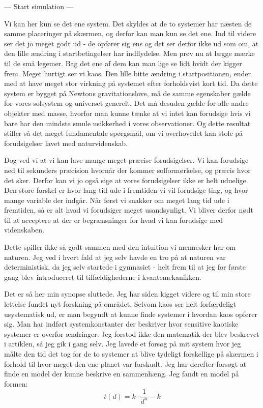 \documentclass[12pt,a4paper]{article}
\theoremstyle{break}
\theoremstyle{nonumberplain}
\begin{document}
\begin{center}
    --- Start simulation ---
\end{center}

Vi kan her kun se det ene system. 
Det skyldes at de to systemer har næsten de samme placeringer på skærmen, og derfor kan man kun se det ene.
Ind til videre ser det jo meget godt ud - de opfører sig ens og det ser derfor ikke ud som om, at den lille ændring i startbetingelser har indflydelse. 
Men prøv nu at lægge mærke til de små legemer.
Bag det ene af dem kan man lige se lidt hvidt der kigger frem. 
Meget hurtigt ser vi kaos. 
Den lille bitte ændring i startpositionen, ender med at have meget stor virkning på systemet efter forholdsvist kort tid. 
Da dette system er bygget på Newtons gravitationslove, må de samme egenskaber gælde for vores solsystem og universet generelt. 
Det må desuden gælde for alle andre objekter med masse, hvorfor man kunne tænke at vi intet kan forudsige hvis vi bare har den mindste smule usikkerhed i vores observationer. 
Og dette resultat stiller så det meget fundamentale spørgsmål, om vi overhovedet kan stole på forudsigelser lavet med naturvidenskab.

Dog ved vi at vi kan lave mange meget præcise forudsigelser. 
Vi kan forudsige ned til sekunders præcision hvornår der kommer solformørkelse, og præcis hvor det sker.
Derfor kan vi jo også sige at vores forudsigelser ikke er helt uduelige. 
Den store forskel er hvor lang tid ude i fremtiden vi vil forudsige ting, og hvor mange variable der indgår.
Når først vi snakker om meget lang tid ude i fremtiden, så er alt hvad vi forudsiger meget usandsynligt.
Vi bliver derfor nødt til at acceptere at der er begrænsninger for hvad vi kan forudsige med videnskaben.

Dette spiller ikke så godt sammen med den intuition vi mennesker har om naturen.
Jeg ved i hvert fald at jeg selv havde en tro på at naturen var deterministisk, da jeg selv startede i gymnasiet - helt frem til at jeg for første gang blev introduceret til tilfældighederne i kvantemekanikken. 

Det er så her min synopse sluttede. 
Jeg har siden kigget videre og til min store lettelse fundet nyt forskning på området.
Selvom kaos ser helt forfærdeligt usystematisk ud, er man begyndt at kunne finde systemer i hvordan kaos opfører sig. 
Man har indført systemkonstanter der beskriver hvor sensitive kaotiske systemer er overfor ændringer. 
Jeg forstod ikke den matematik der blev beskrevet i artiklen, så jeg gik i gang selv. 
Jeg lavede et forsøg på mit system hvor jeg målte den tid det tog for de to systemer at blive tydeligt forskellige på skærmen i forhold til hvor meget den ene planet var forskudt. 
Jeg har derefter forsøgt at finde en model der kunne beskrive en sammenhæng. 
Jeg fandt en model på formen:
$$ t(d) = k \cdot \frac{1}{d^n} - k $$
\end{document}
